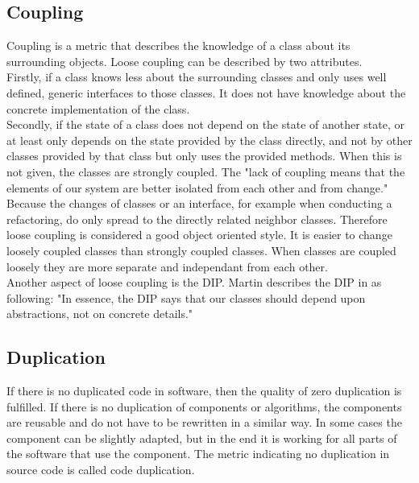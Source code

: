 \subsection*{Coupling}
\label{coupling}
Coupling is a metric that describes the knowledge of a class about its surrounding objects. Loose coupling can be described by two attributes. 
\\
Firstly, if a class knows less about the surrounding classes and only uses well defined, generic interfaces to those classes. It does not have knowledge about the concrete implementation of the class. 
\\
Secondly, if the state of a class does not depend on the state of another state, or at least only depends on the state provided by the class directly, and not by other classes provided by that class but only uses the provided methods. 
When this is not given, the classes are strongly coupled. The "lack of coupling means that the elements of our system are better isolated from each other and from change." \cite[Loose Coupling]{wiki}
Because the changes of classes or an interface, for example when conducting a refactoring, do only spread to the directly related neighbor classes. Therefore loose coupling is considered a good object oriented style. It is easier to change loosely coupled classes than strongly coupled classes. When classes are coupled loosely they are more separate and independant from each other. 
\\

Another aspect of loose coupling is the \ac{DIP}. 
Martin describes the \ac{DIP} in \cite{cc} as following: "In essence, the DIP says that our classes should depend upon abstractions, not on concrete details." \cite{cc}

\subsection*{Duplication}
\label{duplication}
If there is no duplicated code in software, then the quality of zero duplication is fulfilled. If there is no duplication of components or algorithms, the components are reusable and do not have to be rewritten in a similar way. In some cases the component can be slightly adapted, but in the end it is working for all parts of the software that use the component. 
The metric indicating no duplication in source code is called code duplication. 


